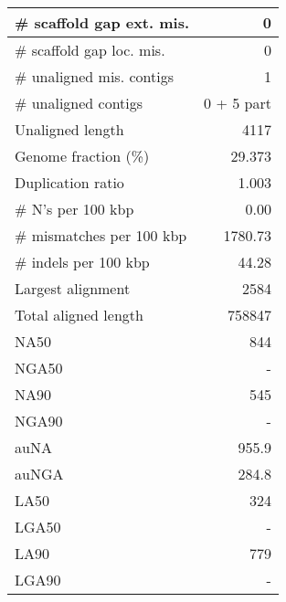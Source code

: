 \documentclass[12pt,a4paper]{article}
\begin{document}
\begin{table}[ht]
\begin{center}
\begin{tabular}{|l*{1}{|r}|}
\# scaffold gap ext. mis. & 0 \\ \hline
\# scaffold gap loc. mis. & 0 \\ \hline
\# unaligned mis. contigs & 1 \\ \hline
\# unaligned contigs & 0 + 5 part \\ \hline
Unaligned length & 4117 \\ \hline
Genome fraction (\%) & 29.373 \\ \hline
Duplication ratio & 1.003 \\ \hline
\# N's per 100 kbp & 0.00 \\ \hline
\# mismatches per 100 kbp & 1780.73 \\ \hline
\# indels per 100 kbp & 44.28 \\ \hline
Largest alignment & 2584 \\ \hline
Total aligned length & 758847 \\ \hline
NA50 & 844 \\ \hline
NGA50 & - \\ \hline
NA90 & 545 \\ \hline
NGA90 & - \\ \hline
auNA & 955.9 \\ \hline
auNGA & 284.8 \\ \hline
LA50 & 324 \\ \hline
LGA50 & - \\ \hline
LA90 & 779 \\ \hline
LGA90 & - \\ \hline
\end{tabular}
\end{center}
\end{table}
\end{document}
